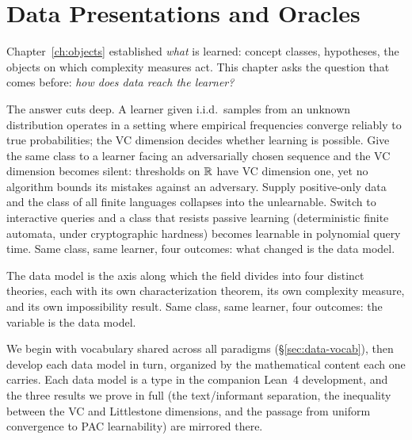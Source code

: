
\chapter{Data Presentations and Oracles}
\label{ch:data}

Chapter~\ref{ch:objects} established \emph{what} is learned: concept classes, hypotheses, the objects on which complexity measures act. This chapter asks the question that comes before: \emph{how does data reach the learner?}

The answer cuts deep. A learner given i.i.d.\ samples from an unknown distribution operates in a setting where empirical frequencies converge reliably to true probabilities; the VC dimension decides whether learning is possible. Give the same class to a learner facing an adversarially chosen sequence and the VC dimension becomes silent: thresholds on $\mathbb{R}$ have VC dimension one, yet no algorithm bounds its mistakes against an adversary. Supply positive-only data and the class of all finite languages collapses into the unlearnable. Switch to interactive queries and a class that resists passive learning (deterministic finite automata, under cryptographic hardness) becomes learnable in polynomial query time. Same class, same learner, four outcomes: what changed is the data model.

The data model is the axis along which the field divides into four distinct theories, each with its own characterization theorem, its own complexity measure, and its own impossibility result. Same class, same learner, four outcomes: the variable is the data model.

We begin with vocabulary shared across all paradigms (\S\ref{sec:data-vocab}), then develop each data model in turn, organized by the mathematical content each one carries. Each data model is a type in the companion Lean~4 development, and the three results we prove in full (the text/informant separation, the inequality between the VC and Littlestone dimensions, and the passage from uniform convergence to PAC learnability) are mirrored there.

